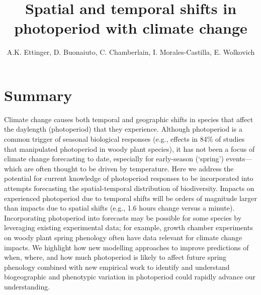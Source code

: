\documentclass{article}
\begin{document}
 
\title{Spatial and temporal shifts in photoperiod with climate change} %

\author{A.K. Ettinger, D. Buonaiuto, C. Chamberlain, I. Morales-Castilla, E. Wolkovich}
\maketitle  %


\section*{Summary}
Climate change causes both temporal and geographic shifts in species that affect the daylength (photoperiod) that they experience. Although photoperiod is a common trigger of seasonal biological responses (e.g., effects in 84\% of studies that manipulated photoperiod in woody plant species), it has not been a focus of climate change forecasting to date, especially for early-season (`spring') events---which are often thought to be driven by temperature. Here we address the potential for current knowledge of photoperiod responses to be incorporated into attempts forecasting the spatial-temporal distribution of biodiversity. Impacts on experienced photoperiod due to temporal shifts will be orders of magnitude larger than impacts due to spatial shifts (e.g., 1.6 hours change versus a minute). Incorporating photoperiod into forecasts may be possible for some species by leveraging existing experimental data; for example, growth chamber experiments on woody plant spring phenology often have data relevant for climate change impacts. We highlight how new modelling approaches to improve predictions of when, where, and how much photoperiod is likely to affect future spring phenology combined with new empirical work to identify and understand biogeographic and phenotypic variation in photoperiod could rapidly advance our understanding. 
\end{document}
